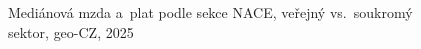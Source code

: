 \def\strProblemyVerejnySoukromyCaption{Mediánová mzda a~plat podle sekce \acs{NACE}, veřejný vs.\ soukromý sektor, \acs{geo-CZ}, 2025}%
%
\begin{figure}[htbp]
  \centering
  \resizebox{0.92\linewidth}{!}{}
  \caption{\strProblemyVerejnySoukromyCaption}
  \label{fig:problemy_verejny_soukromy}
\end{figure}
